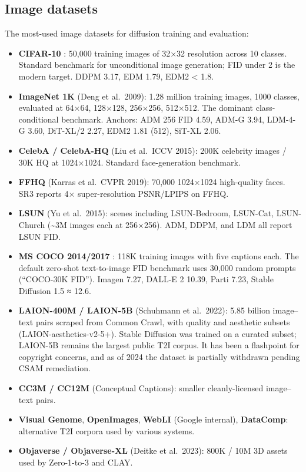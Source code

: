\documentclass{article}
\begin{document}
\subsection{Image datasets}\label{image-datasets}

The most-used image datasets for diffusion training and evaluation:

\begin{itemize}

\item
  \textbf{CIFAR-10} \citep{krizhevsky2009learningmultiplela}: 50,000 training images of 32×32 resolution across 10 classes. Standard benchmark for unconditional image generation; FID under 2 is the modern target. DDPM 3.17, EDM 1.79, EDM2 \textless{} 1.8.
\item
  \textbf{ImageNet 1K} (Deng et al.~2009): 1.28 million training images, 1000 classes, evaluated at 64×64, 128×128, 256×256, 512×512. The dominant class-conditional benchmark. Anchors: ADM 256 FID 4.59, ADM-G 3.94, LDM-4-G 3.60, DiT-XL/2 2.27, EDM2 1.81 (512), SiT-XL 2.06.
\item
  \textbf{CelebA / CelebA-HQ} (Liu et al.~ICCV 2015): 200K celebrity images / 30K HQ at 1024×1024. Standard face-generation benchmark.
\item
  \textbf{FFHQ} (Karras et al.~CVPR 2019): 70,000 1024×1024 high-quality faces. SR3 reports 4× super-resolution PSNR/LPIPS on FFHQ.
\item
  \textbf{LSUN} (Yu et al.~2015): scenes including LSUN-Bedroom, LSUN-Cat, LSUN-Church (\textasciitilde3M images each at 256×256). ADM, DDPM, and LDM all report LSUN FID.
\item
  \textbf{MS COCO 2014/2017} \citep{lin2014microsoftcococommo}: 118K training images with five captions each. The default zero-shot text-to-image FID benchmark uses 30,000 random prompts (``COCO-30K FID''). Imagen 7.27, DALL-E 2 10.39, Parti 7.23, Stable Diffusion 1.5 ≈ 12.6.
\item
  \textbf{LAION-400M / LAION-5B} (Schuhmann et al.~2022): 5.85 billion image--text pairs scraped from Common Crawl, with quality and aesthetic subsets (LAION-aesthetics-v2-5+). Stable Diffusion was trained on a curated subset; LAION-5B remains the largest public T2I corpus. It has been a flashpoint for copyright concerns, and as of 2024 the dataset is partially withdrawn pending CSAM remediation.
\item
  \textbf{CC3M / CC12M} (Conceptual Captions): smaller cleanly-licensed image--text pairs.
\item
  \textbf{Visual Genome}, \textbf{OpenImages}, \textbf{WebLI} (Google internal), \textbf{DataComp}: alternative T2I corpora used by various systems.
\item
  \textbf{Objaverse / Objaverse-XL} (Deitke et al.~2023): 800K / 10M 3D assets used by Zero-1-to-3 and CLAY.
\end{itemize}
\end{document}
